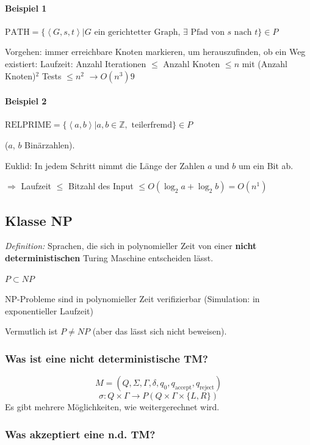 \paragraph{Beispiel 1} $\text{PATH} = \{ \left< G, s, t \right> | G \text{ ein gerichtetter Graph, } \exists \text{ Pfad von } s \text{ nach } t\} \in P$

Vorgehen: immer erreichbare Knoten markieren, um herauszufinden, ob ein Weg existiert: Laufzeit: Anzahl Iterationen $\leq$ Anzahl Knoten $\leq n$  
mit (Anzahl Knoten)$^2$ Tests $\leq n^2$ $\longrightarrow O(n^3)9$
	
\paragraph{Beispiel 2} $\text{RELPRIME} = \{ \left<a,b\right> | a, b \in \mathbb{Z}, \text{ teilerfremd} \} \in P$

($a$, $b$ Binärzahlen).

Euklid: In jedem Schritt nimmt die Länge der Zahlen $a$ und $b$ um ein Bit ab.

$\Rightarrow$ Laufzeit $\leq$ Bitzahl des Input $\leq O(\log_2{a} + \log_2{b}) = O(n^1)$


\subsection{Klasse NP}

\emph{Definition:} Sprachen, die sich in polynomieller Zeit von einer \textbf{nicht deterministischen} Turing Maschine entscheiden lässt.

$P \subset NP$

NP-Probleme sind in polynomieller Zeit verifizierbar (Simulation: in exponentieller Laufzeit)

Vermutlich ist $P \neq NP$ (aber das lässt sich nicht beweisen).

\subsubsection{Was ist eine nicht deterministische TM?}
\[
	M= (Q, \Sigma, \Gamma, \delta, q_0, q_\text{accept}, q_\text{reject})
\]
\[
	\sigma: Q \times \Gamma \longrightarrow P(Q \times \Gamma \times \{L,R\})
\]
Es gibt mehrere Möglichkeiten, wie weitergerechnet wird.

\subsubsection{Was akzeptiert eine n.d. TM?}

